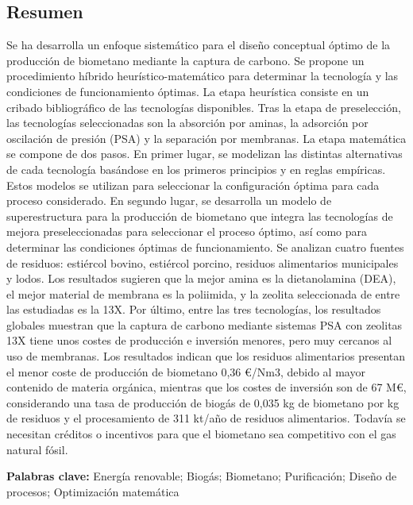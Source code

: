 \begin{refsection}[referencesCh7]
\section*{Resumen}
Se ha desarrolla un enfoque sistemático para el diseño conceptual óptimo de la producción de biometano mediante la captura de carbono. Se propone un procedimiento híbrido heurístico-matemático para determinar la tecnología y las condiciones de funcionamiento óptimas. La etapa heurística consiste en un cribado bibliográfico de las tecnologías disponibles. Tras la etapa de preselección, las tecnologías seleccionadas son la absorción por aminas, la adsorción por oscilación de presión (PSA) y la separación por membranas. La etapa matemática se compone de dos pasos. En primer lugar, se modelizan las distintas alternativas de cada tecnología basándose en los primeros principios y en reglas empíricas. Estos modelos se utilizan para seleccionar la configuración óptima para cada proceso considerado. En segundo lugar, se desarrolla un modelo de superestructura para la producción de biometano que integra las tecnologías de mejora preseleccionadas para seleccionar el proceso óptimo, así como para determinar las condiciones óptimas de funcionamiento. Se analizan cuatro fuentes de residuos: estiércol bovino, estiércol porcino, residuos alimentarios municipales y lodos. Los resultados sugieren que la mejor amina es la dietanolamina (DEA), el mejor material de membrana es la poliimida, y la zeolita seleccionada de entre las estudiadas es la 13X. Por último, entre las tres tecnologías, los resultados globales muestran que la captura de carbono mediante sistemas PSA con zeolitas 13X tiene unos costes de producción e inversión menores, pero muy cercanos al uso de membranas. Los resultados indican que los residuos alimentarios presentan el menor coste de producción de biometano 0,36 €/Nm3, debido al mayor contenido de materia orgánica, mientras que los costes de inversión son de 67 M€, considerando una tasa de producción de biogás de 0,035 kg de biometano por kg de residuos y el procesamiento de 311 kt/año de residuos alimentarios. Todavía se necesitan créditos o incentivos para que el biometano sea competitivo con el gas natural fósil.

\bigskip
\textbf{Palabras clave:} Energía renovable; Biogás; Biometano; Purificación; Diseño de procesos; Optimización matemática
\newpage


\end{refsection}
